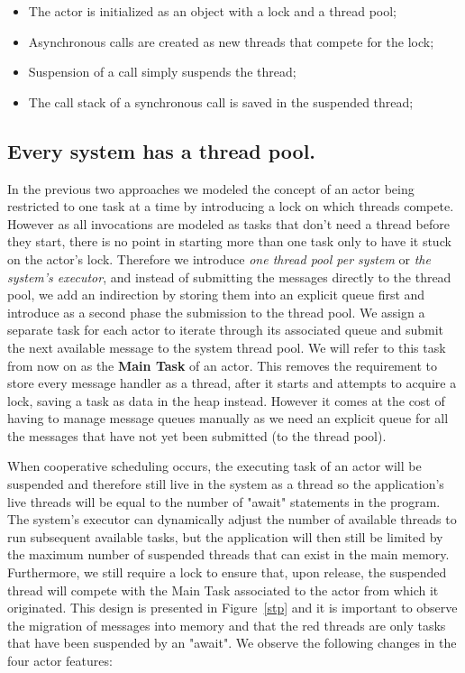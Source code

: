 \begin{itemize}
	\item The actor is initialized as an object with a lock and a thread pool;
	\item Asynchronous calls are created as new threads that compete for the lock;
	\item Suspension of a call simply suspends the thread;
	\item The call stack of a synchronous call is saved in the suspended thread;
\end{itemize}





\subsection{Every system has a thread pool.}
In the previous two approaches we modeled the concept of an actor being restricted to one task at a time by introducing a lock on which threads compete. However as all invocations are modeled as tasks that don't need a thread before they start, there is no point in starting more than one task only to have it stuck on the actor's lock. Therefore we introduce \textit{one thread pool per system} or \textit{the system's executor}, and instead of submitting the messages directly to the thread pool, we add an indirection by storing them into an explicit queue first and introduce as a second phase the submission to the thread pool. We assign a separate task for each actor to iterate through its associated queue and submit the next available message to the system thread pool. We will refer to this task from now on as the \textbf{Main Task} of an actor. This removes the requirement to store every message handler as a thread, after it starts and attempts to acquire a lock, saving a task as data in the heap instead.  However it comes at the cost of having to manage message queues manually as we need an explicit queue for all the messages that have not yet been submitted (to the thread pool). 
\par When cooperative scheduling occurs, the executing task of an actor will be suspended and therefore still live in the system as a thread so the application's live threads will be equal to the number of "await" statements in the program. The system's executor can dynamically adjust the number of available threads to run subsequent available tasks, but the application will then still be limited by the maximum number of suspended threads that can exist in the main memory. Furthermore, we still require a lock to ensure that, upon release, the suspended thread will compete with the Main Task associated to the actor from which it originated. This design is presented in Figure~\ref{stp} and it is important to observe the migration of messages into memory and that the red threads are only tasks that have been suspended by an "await". We observe the following changes in the four actor features:

